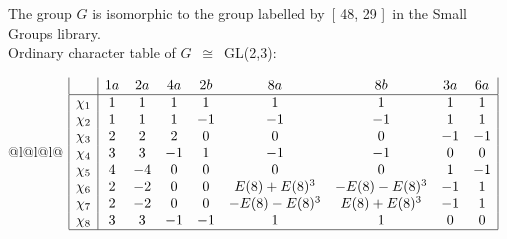 \documentclass[varwidth=\maxdimen,border=10]{standalone}
\begin{document}
The group $G$ is isomorphic to the group labelled by\ [ 48, 29 ]\ in the Small Groups library.\\
Ordinary character table of $G$\ $\cong$\ GL(2,3):\\
\begin{center}
\begin{tabular}{@{}l@{}l@{}l@{}}
\hline
\(\begin{array}{|l|cccccccc|}
  & 1a & 2a & 4a & 2b & 8a & 8b & 3a & 6a\\ \hline
\chi_{1} & 1 & 1 & 1 & 1 & 1 & 1 & 1 & 1\\
\chi_{2} & 1 & 1 & 1 & -1 & -1 & -1 & 1 & 1\\
\chi_{3} & 2 & 2 & 2 & 0 & 0 & 0 & -1 & -1\\
\chi_{4} & 3 & 3 & -1 & 1 & -1 & -1 & 0 & 0\\
\chi_{5} & 4 & -4 & 0 & 0 & 0 & 0 & 1 & -1\\
\chi_{6} & 2 & -2 & 0 & 0 & E(8)+E(8)^{3} & -E(8)-E(8)^{3} & -1 & 1\\
\chi_{7} & 2 & -2 & 0 & 0 & -E(8)-E(8)^{3} & E(8)+E(8)^{3} & -1 & 1\\
\chi_{8} & 3 & 3 & -1 & -1 & 1 & 1 & 0 & 0\\
\hline
\end{array}\)\\
\end{tabular}
\end{center}
\end{document}
